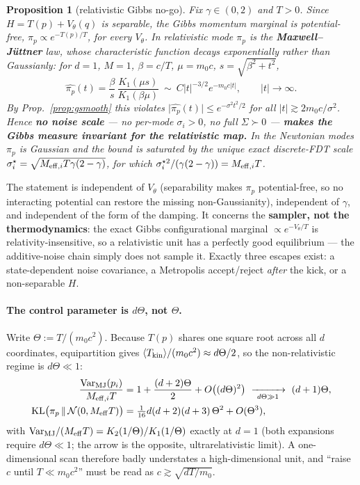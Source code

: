 \documentclass[11pt]{article}
\theoremstyle{plain}
\newtheorem{proposition}{Proposition}
\theoremstyle{definition}
\begin{document}
\begin{proposition}[relativistic Gibbs no-go]\label{prop:relnogo}
Fix $\gamma\in(0,2)$ and $T>0$. Since $H=T(p)+V_\theta(q)$ is separable, the Gibbs momentum marginal is potential-free, $\pi_p\propto e^{-T(p)/T}$, \emph{for every} $V_\theta$. In relativistic mode $\pi_p$ is the \textbf{Maxwell--J\"uttner} law, whose characteristic function decays exponentially rather than Gaussianly: for $d=1$, $M=1$, $\beta=c/T$, $\mu=m_0c$, $s=\sqrt{\beta^2+t^2}$,
\[ \widehat{\pi_p}(t)=\frac{\beta}{s}\,\frac{K_1(\mu s)}{K_1(\beta\mu)}\ \sim\ C\lvert t\rvert^{-3/2}e^{-m_0c\lvert t\rvert},\qquad \lvert t\rvert\to\infty. \]
By Prop.~\ref{prop:gsmooth} this violates $\lvert\widehat{\pi_p}(t)\rvert\le e^{-\sigma^2t^2/2}$ for all $\lvert t\rvert\gtrsim2m_0c/\sigma^2$. Hence \textbf{no noise scale} --- no per-mode $\sigma_i>0$, no full $\Sigma\succ0$ --- \textbf{makes the Gibbs measure invariant for the relativistic map.} In the Newtonian modes $\pi_p$ \emph{is} Gaussian and the bound is saturated by the unique exact discrete-FDT scale $\sigma_i^\star=\sqrt{M_{{\rm eff},i}T\gamma(2-\gamma)}$, for which $\sigma_i^{\star2}/(\gamma(2-\gamma))=M_{{\rm eff},i}T$.
\end{proposition}
The statement is independent of $V_\theta$ (separability makes $\pi_p$ potential-free, so no interacting potential can restore the missing non-Gaussianity), independent of $\gamma$, and independent of the form of the damping. It concerns the \textbf{sampler, not the thermodynamics}: the exact Gibbs configurational marginal $\propto e^{-V_\theta/T}$ is relativity-insensitive, so a relativistic unit has a perfectly good equilibrium --- the additive-noise chain simply does not sample it. Exactly three escapes exist: a state-dependent noise covariance, a Metropolis accept/reject \emph{after} the kick, or a non-separable $H$.

\paragraph{The control parameter is $d\Theta$, not $\Theta$.} Write $\Theta:=T/(m_0c^2)$. Because $T(p)$ shares one square root across all $d$ coordinates, equipartition gives $\langle T_{\rm kin}\rangle/(m_0c^2)\approx d\Theta/2$, so the non-relativistic regime is $d\Theta\ll1$:
\begin{align*}
\frac{\mathrm{Var}_{\rm MJ}(p_i)}{M_{{\rm eff},i}T}&=1+\frac{(d+2)\Theta}{2}+O\bigl((d\Theta)^2\bigr)\ \xrightarrow[\ d\Theta\gg1\ ]{}\ (d+1)\Theta,\\
\mathrm{KL}\bigl(\pi_p\,\Vert\,\mathcal N(0,M_{\rm eff}T)\bigr)&=\tfrac{1}{16}d(d+2)(d+3)\,\Theta^2+O(\Theta^3),
\end{align*}
with $\mathrm{Var}_{\rm MJ}/(M_{\rm eff}T)=K_2(1/\Theta)/K_1(1/\Theta)$ exactly at $d=1$ (both expansions require $d\Theta\ll1$; the arrow is the opposite, ultrarelativistic limit). A one-dimensional scan therefore badly understates a high-dimensional unit, and ``raise $c$ until $T\ll m_0c^2$'' must be read as $c\gtrsim\sqrt{dT/m_0}$.
\end{document}
